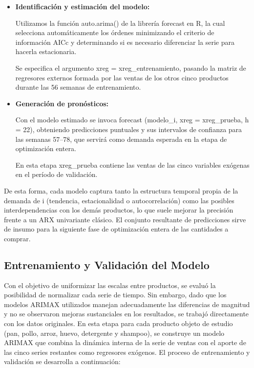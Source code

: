 \documentclass[12pt]{article}
\begin{document}
\begin{itemize}
    \item \textbf{Identificación y estimación del modelo:}

Utilizamos la función auto.arima() de la librería forecast en R, la cual selecciona automáticamente los órdenes minimizando el criterio de información AICc y determinando si es necesario diferenciar la serie para hacerla estacionaria.

Se especifica el argumento xreg = xreg\_entrenamiento, pasando la matriz de regresores externos formada por las ventas de los otros cinco productos durante las 56 semanas de entrenamiento.

    \item \textbf{Generación de pronósticos:}

Con el modelo estimado se invoca forecast (modelo\_i, xreg = xreg\_prueba, h = 22), obteniendo predicciones puntuales y sus intervalos de confianza para las semanas 57–78, que servirá como demanda esperada en la etapa de optimización entera.

En esta etapa xreg\_prueba contiene las ventas de las cinco variables exógenas en el período de validación.

\end{itemize}

\vspace{0.5cm}

De esta forma, cada modelo captura tanto la estructura temporal propia de la demanda de i (tendencia, estacionalidad o autocorrelación) como las posibles interdependencias con los demás productos, lo que suele mejorar la precisión frente a un ARX univariante clásico. El conjunto resultante de predicciones sirve de insumo para la siguiente fase de optimización entera de las cantidades a comprar.

\vspace{0.5cm}
\subsection{Entrenamiento y Validación del Modelo}

Con el objetivo de uniformizar las escalas entre productos, se evaluó la posibilidad de normalizar cada serie de tiempo. Sin embargo, dado que los modelos ARIMAX utilizados manejan adecuadamente las diferencias de magnitud y no se observaron mejoras sustanciales en los resultados, se trabajó directamente con los datos originales.
\vspace{0.3cm}
En esta etapa para cada producto objeto de estudio (pan, pollo, arroz, huevo, detergente y shampoo), se construye un modelo ARIMAX que combina la dinámica interna de la serie de ventas con el aporte de las cinco series restantes como regresores exógenos. El proceso de entrenamiento y validación se desarrolla a continuación:
\end{document}
